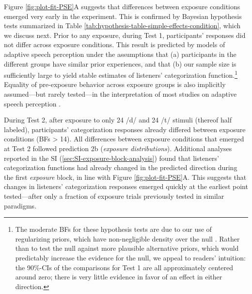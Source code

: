 \documentclass[
  11pt,
  man,mask,floatsintext]{apa6}
\begin{document}
Figure \ref{fig:plot-fit-PSE}A suggests that differences between exposure conditions emerged very early in the experiment. This is confirmed by Bayesian hypothesis tests summarized in Table \ref{tab:hypothesis-table-simple-effects-condition}, which we discuss next. Prior to any exposure, during Test 1, participants' responses did not differ across exposure conditions. This result is predicted by models of adaptive speech perception under the assumptions that (a) participants in the different groups have similar prior experiences, and that (b) our sample size is sufficiently large to yield stable estimates of listeners' categorization function.\footnote{ The moderate BFs for these hypothesis tests are due to our use of regularizing priors, which have non-negligible density over the null \autocite[for an introduction to the Savage-Dickey method, see][]{wagenmakers2010}. Rather than to test the null against more plausible alternative priors, which would predictably increase the evidence for the null, we appeal to readers' intuition: the 90\%-CIs of the comparisons for Test 1 are all approximately centered around zero; there is very little evidence in favor of an effect in either direction.} Equality of pre-exposure behavior across exposure groups is also implicitly assumed---but rarely tested---in the interpretation of most studies on adaptive speech perception \autocite[when it is tested, it often turns out that this assumption is \emph{not} necessarily warranted, presumably due to insufficient sample sizes, cf.][]{kleinschmidt2020}.

During Test 2, after exposure to only 24 /d/ and 24 /t/ stimuli (thereof half labeled), participants' categorization responses already differed between exposure conditions (BFs \textgreater{} 14). All differences between exposure conditions that emerged at Test 2 followed prediction 2b (\emph{exposure distributions}). Additional analyses reported in the SI (\ref{sec:SI-exposure-block-analysis}) found that listeners' categorization functions had already changed in the predicted direction during the first \emph{exposure} block, in line with Figure \ref{fig:plot-fit-PSE}A. This suggests that changes in listeners' categorization responses emerged quickly at the earliest point tested---after only a fraction of exposure trials previously tested in similar paradigms.
\end{document}
